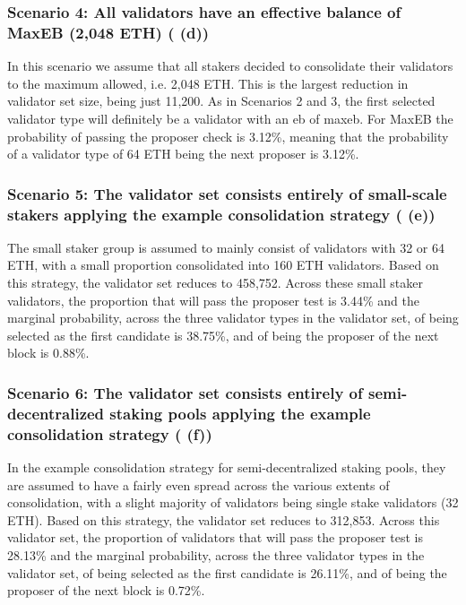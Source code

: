 \documentclass[submission,copyright,creativecommons]{eptcs}
\begin{document}
\subsubsection*{Scenario 4: All validators have an effective balance of MaxEB (2,048 ETH) ( (d))}
In this scenario we assume that all stakers decided to consolidate their validators to the maximum allowed, i.e. 2,048 ETH. This is the largest reduction in validator set size, being just 11,200. As in Scenarios 2 and 3, the first selected validator type will definitely be a validator with an \gls{eb} of \gls{maxeb}. For MaxEB the probability of passing the proposer check is 3.12\%, meaning that the probability of a validator type of 64 ETH being the next proposer is 3.12\%.

\subsubsection*{Scenario 5: The validator set consists entirely of small-scale stakers applying the example consolidation strategy ( (e))}
The small staker group is assumed to mainly consist of validators with 32 or 64 ETH, with a small proportion consolidated into 160 ETH validators. Based on this strategy, the validator set reduces to 458,752. Across these small staker validators, the proportion that will pass the proposer test is 3.44\% and the marginal probability, across the three validator types in the validator set, of being selected as the first candidate is
38.75\%, and of being the proposer of the next block is 0.88\%.

\subsubsection*{Scenario 6: The validator set consists entirely of semi-decentralized staking pools applying the example consolidation strategy ( (f))}
In the example consolidation strategy for semi-decentralized staking pools, they are assumed to have a fairly even spread across the various extents of consolidation, with a slight majority of validators being single stake validators (32 ETH). Based on this strategy, the validator set reduces to 312,853. Across this validator set, the proportion of validators that will pass the proposer test is 28.13\% and the marginal probability, across the three validator types in the validator set, of being selected as the first candidate is
26.11\%, and of being the proposer of the next block is 0.72\%.
\end{document}
